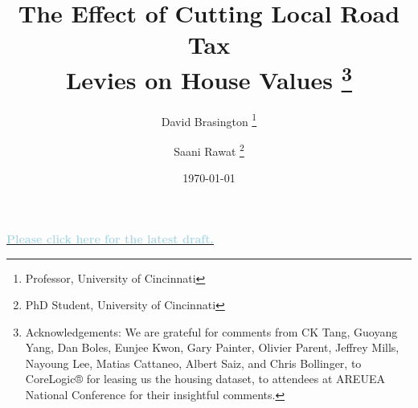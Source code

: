 \documentclass[12pt]{article}
\begin{document}
\begin{titlepage}
\title{The Effect of Cutting Local Road Tax \\ Levies on House Values
\thanks{Acknowledgements: We are grateful for comments from CK Tang, Guoyang Yang, Dan Boles, Eunjee Kwon, Gary Painter, Olivier Parent, Jeffrey Mills, Nayoung Lee, Matias Cattaneo, Albert Saiz, and Chris Bollinger, to CoreLogic® for leasing us the housing dataset, to attendees at AREUEA National Conference for their insightful comments.}}
\author{David Brasington \thanks{Professor, University of Cincinnati} \and Saani Rawat \thanks{PhD Student, University of Cincinnati}}
\date{\today}
\maketitle

\noindent
\begin{center}
\textbf{\href{https://example.com/latest-draft}{\textcolor{lightblue}{Please click here for the latest draft.}}}
\end{center}


\end{titlepage}
\end{document}
